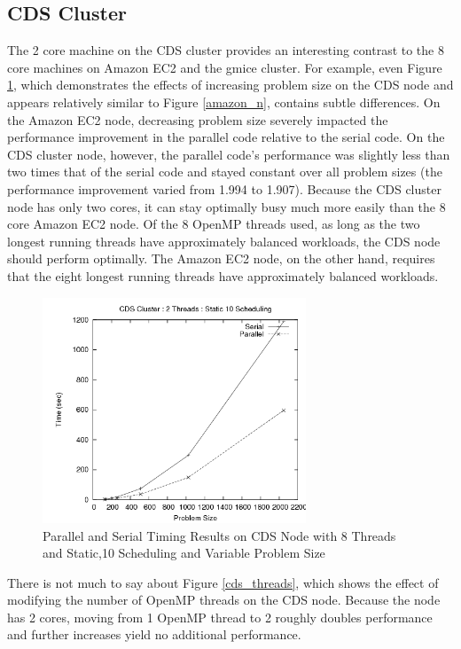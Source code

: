 \documentclass{article}
\begin{document}
\subsection{CDS Cluster}

The 2 core machine on the CDS cluster provides an interesting contrast to the 8 core machines on Amazon EC2 and the gmice cluster. For example, even Figure \ref{cds_n}, which demonstrates the effects of increasing problem size on the CDS node and appears relatively similar to Figure \ref{amazon_n}, contains subtle differences. On the Amazon EC2 node, decreasing problem size severely impacted the performance improvement in the parallel code relative to the serial code. On the CDS cluster node, however, the parallel code's performance was slightly less than two times that of the serial code and stayed constant over all problem sizes (the performance improvement varied from 1.994 to 1.907). Because the CDS cluster node has only two cores, it can stay optimally busy much more easily than the 8 core Amazon EC2 node. Of the 8 OpenMP threads used, as long as the two longest running threads have approximately balanced workloads, the CDS node should perform optimally. The Amazon EC2 node, on the other hand, requires that the eight longest running threads have approximately balanced workloads.

\begin{figure}
\centering
\includegraphics[width=0.7\textwidth]{../data/cds_n.png}
\caption{Parallel and Serial Timing Results on CDS Node with 8 Threads and Static,10 Scheduling and Variable Problem Size}
\label{cds_n}
\end{figure}

There is not much to say about Figure \ref{cds_threads}, which shows the effect of modifying the number of OpenMP threads on the CDS node. Because the node has 2 cores, moving from 1 OpenMP thread to 2 roughly doubles performance and further increases yield no additional performance.
\end{document}
